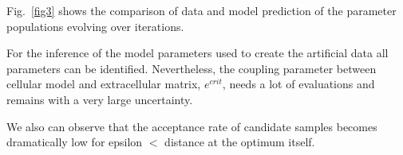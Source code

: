 \documentclass[10pt,letterpaper]{article}
\begin{document}

Fig.~\ref{fig3} shows the comparison of data and model prediction of the parameter populations evolving over iterations.

For the inference of the model parameters used to create the artificial data all parameters can be identified. Nevertheless, the coupling parameter between cellular model and extracellular matrix, $e^{crit}$, needs a lot of evaluations and remains with a very large uncertainty. 

We also can observe that the acceptance rate of candidate samples becomes dramatically low for epsilon $<$ distance at the optimum itself.
\end{document}
